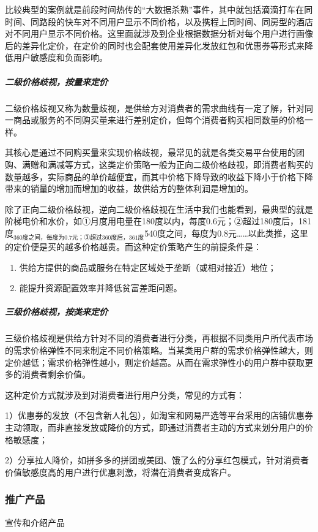 \documentclass[letterpaper,11pt,english]{sphinxmanual}
\begin{document}
比较典型的案例就是前段时间热传的“大数据杀熟”事件，其中就包括滴滴打车在同时间、同路段的快车对不同用户显示不同价格，以及携程上同时间、同房型的酒店对不同用户显示不同价格。这里面就涉及到企业根据数据分析对每个用户进行画像后的差异化定价，在定价的同时也会配套使用差异化发放红包和优惠券等形式来降低用户敏感度和负面影响。


\subparagraph{二级价格歧视，按量来定价}
\label{\detokenize{chapter_knowledge/price:id6}}
二级价格歧视又称为数量歧视，是供给方对消费者的需求曲线有一定了解，针对同一商品或服务的不同购买量来进行差别定价，但每个消费者购买相同数量的价格一样。

其核心是通过不同购买量来实现价格歧视，最常见的就是各类交易平台使用的团购、满赠和满减等方式，这类定价策略一般为正向二级价格歧视，即消费者购买的数量越多，实际商品的单价越便宜，而其中价格下降导致的收益下降小于价格下降带来的销量的增加而增加的收益，故供给方的整体利润是增加的。

除了正向二级价格歧视，逆向二级价格歧视在生活中我们也能看到，最典型的就是阶梯电价和水价，如①月度用电量在180度以内，每度0.6元；②超过180度后，181度$_{\text{360度之间，每度为0.7元；③超过360度后，361度}}$540度之间，每度为0.8元……以此类推，这里的定价便是买的越多价格越贵。而这种定价策略产生的前提条件是：
\begin{enumerate}
%
\item {} 
供给方提供的商品或服务在特定区域处于垄断（或相对接近）地位；

\item {} 
能提升资源配置效率并降低贫富差距问题。

\end{enumerate}


\subparagraph{三级价格歧视，按类来定价}
\label{\detokenize{chapter_knowledge/price:id7}}
三级价格歧视是供给方针对不同的消费者进行分类，再根据不同类用户所代表市场的需求价格弹性不同来制定不同价格策略。当某类用户群的需求价格弹性越大，则定价越低；需求价格弹性越小，则定价越高。从而在需求弹性小的用户群中获取更多的消费者剩余价值。

这种定价方式就涉及到对消费者进行用户分类，常见的方式有：

1）优惠券的发放（不包含新人礼包），如淘宝和网易严选等平台采用的店铺优惠券主动领取，而非直接发放或降价的方式，即通过消费者主动的方式来划分用户的价格敏感度；

2）分享拉人降价，如拼多多的拼团或美团、饿了么的分享红包模式，针对消费者价值敏感度高的用户进行优惠刺激，将潜在消费者变成客户。


\subsubsection{推广产品}
\label{\detokenize{chapter_knowledge/more_users:id1}}\label{\detokenize{chapter_knowledge/more_users::doc}}
宣传和介绍产品
\end{document}
